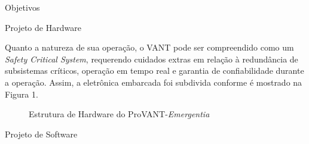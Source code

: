 \documentclass[final,20pt]{beamer}
\newlength{\colwidth}
\begin{document}
\begin{frame}[t]
\begin{columns}[t]
\begin{column}{\colwidth}
\begin{block}{Objetivos}

  \end{block}
\vspace{-2em}
  \begin{block}{Projeto de Hardware}

    Quanto a natureza de sua operação, o VANT pode ser compreendido como um \textit{Safety Critical System}, requerendo cuidados extras em relação à redundância de subsistemas críticos, operação em tempo real e garantia de confiabilidade durante a operação.
    Assim, a eletrônica embarcada foi subdivida conforme é mostrado na Figura 1.
    

    \begin{figure}
        \centering
         
        \caption{Estrutura de Hardware do ProVANT-\textit{Emergentia}}
        \label{fig:hardware-structure}
    \end{figure}

  \end{block}
  \vspace{-2em}
  \begin{block}{Projeto de Software}
   

\end{block}
\end{column}
\end{columns}
\end{frame}
\end{document}
